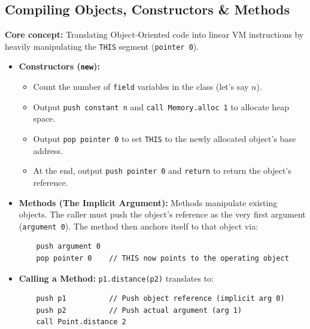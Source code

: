 \documentclass[12pt,a4paper]{article}
\begin{document}
\subsection{Compiling Objects, Constructors \& Methods}
\textbf{Core concept:} Translating Object-Oriented code into linear VM instructions by heavily manipulating the \texttt{THIS} segment (\texttt{pointer 0}).
\begin{itemize}
    \item \textbf{Constructors (\texttt{new}):} 
    \begin{itemize}
        \item Count the number of \texttt{field} variables in the class (let's say $n$).
        \item Output \texttt{push constant n} and \texttt{call Memory.alloc 1} to allocate heap space.
        \item Output \texttt{pop pointer 0} to set \texttt{THIS} to the newly allocated object's base address.
        \item At the end, output \texttt{push pointer 0} and \texttt{return} to return the object's reference.
    \end{itemize}
    \item \textbf{Methods (The Implicit Argument):} Methods manipulate existing objects. The caller must push the object's reference as the very first argument (\texttt{argument 0}). The method then anchors itself to that object via:
    \begin{verbatim}
    push argument 0
    pop pointer 0    // THIS now points to the operating object
    \end{verbatim}
    \item \textbf{Calling a Method:} \texttt{p1.distance(p2)} translates to:
    \begin{verbatim}
    push p1          // Push object reference (implicit arg 0)
    push p2          // Push actual argument (arg 1)
    call Point.distance 2
    \end{verbatim}
\end{itemize}
\end{document}

